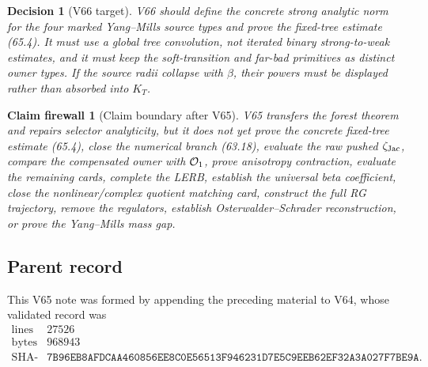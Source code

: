 \documentclass[11pt,oneside]{book}
\newtheorem{firewall}[theorem]{Claim firewall}
\newtheorem{decision}[theorem]{Decision}
\theoremstyle{definition}
\theoremstyle{remark}
\begin{document}
\begin{decision}[V66 target]
\label{dec:e8v65-next}
V66 should define the concrete strong analytic norm for the four
marked Yang--Mills source types and prove the fixed-tree estimate
(65.4).  It must use a global tree convolution, not iterated binary
strong-to-weak estimates, and it must keep the soft-transition and
far-bad primitives as distinct owner types.  If the source radii
collapse with \(\beta\), their powers must be displayed rather than
absorbed into \(K_T\).
\end{decision}

\begin{firewall}[Claim boundary after V65]
\label{fire:e8v65-claim}
V65 transfers the forest theorem and repairs selector analyticity,
but it does not yet prove the concrete fixed-tree estimate (65.4),
close the numerical branch (63.18), evaluate the raw pushed
\(\zeta_{\rm Jac}\), compare the compensated owner with
\({\cal O}_1\), prove anisotropy contraction, evaluate the remaining
cards, complete the LERB, establish the universal beta coefficient,
close the nonlinear/complex quotient matching card, construct the
full RG trajectory, remove the regulators, establish
Osterwalder--Schrader reconstruction, or prove the Yang--Mills mass
gap.
\end{firewall}

\subsection{Parent record}

This V65 note was formed by appending the preceding material to V64,
whose validated record was
\[
\begin{array}{c|c}
\text{lines}&27526\\
\text{bytes}&968943\\
\text{SHA-256}&
\texttt{7B96EB8AFDCAA460856EE8C0E56513F946231D7E5C9EEB62EF32A3A027F7BE9A}.
\end{array}
\]

\end{document}

